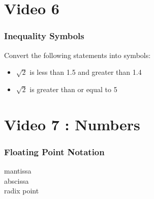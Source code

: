 \documentclass{beamer}
\begin{document}
\section{Video 6}
\begin{frame}
\frametitle{Inequality Symbols}
\Large
Convert the following statements into symbols:

\begin{itemize}
\item $\sqrt{2}$ is less than 1.5 and greater than 1.4
\item $\sqrt{2}$ is greater than or equal to 5
\end{itemize}

\end{frame}

\section{Video 7 : Numbers}
\begin{frame}
\frametitle{Floating Point Notation}
\Large

\begin{description}
\item[mantissa]
\item[abscissa]
\item[radix point]
\end{description}
\end{frame}
\end{document}
